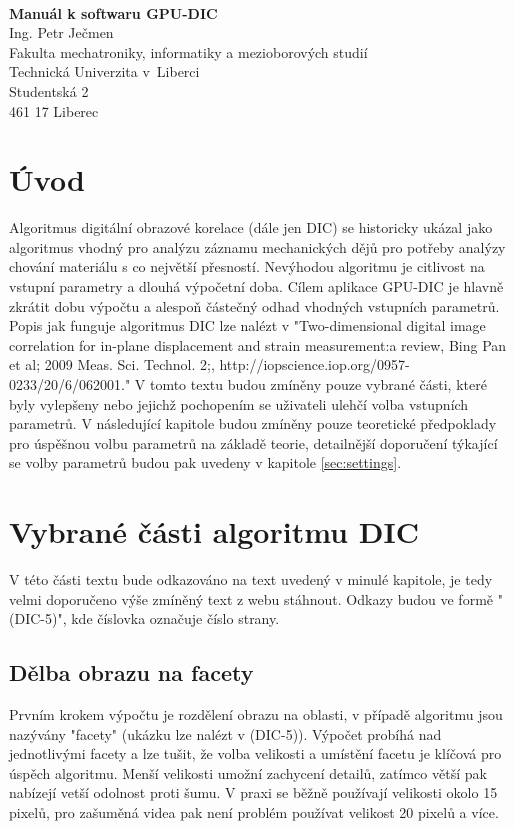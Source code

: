 \documentclass[a4paper,12pt]{article}
\date{September 13, 2013}
\begin{document}
\listoftodos
\newpage
\logo
\\\vspace{6pt}
\begin{center}
\large{\bfseries Manuál k softwaru GPU-DIC}
\\\vspace{1pc}
\small{
Ing. Petr Ječmen
\\\vspace{1pc}
Fakulta mechatroniky, informatiky a mezioborových studií\\
Technická Univerzita v~Liberci\\
Studentská 2\\
461 17 Liberec}
\end{center}
\newpage
\section{Úvod}
Algoritmus digitální obrazové korelace (dále jen DIC) se historicky ukázal jako algoritmus vhodný pro analýzu záznamu mechanických dějů pro potřeby analýzy chování materiálu s co největší přesností. Nevýhodou algoritmu je citlivost na vstupní parametry a dlouhá výpočetní doba. Cílem aplikace GPU-DIC je  hlavně zkrátit dobu výpočtu a alespoň částečný odhad vhodných vstupních parametrů.
Popis jak funguje algoritmus DIC lze nalézt v "Two-dimensional digital image correlation for in-plane displacement and strain measurement:a review, Bing Pan et al; 2009 Meas. Sci. Technol. 2;, http://iopscience.iop.org/0957-0233/20/6/062001." V tomto textu budou zmíněny pouze vybrané části, které byly vylepšeny nebo jejichž pochopením se uživateli ulehčí volba vstupních parametrů. V následující kapitole budou zmíněny pouze teoretické předpoklady pro úspěšnou volbu parametrů na základě teorie, detailnější doporučení týkající se volby parametrů budou pak uvedeny v kapitole \ref{sec:settings}.
\newpage
\section{Vybrané části algoritmu DIC}
V této části textu bude odkazováno na text uvedený v minulé kapitole, je tedy velmi doporučeno výše zmíněný text z webu stáhnout. Odkazy budou ve formě "(DIC-5)", kde číslovka označuje číslo strany.
\subsection{Dělba obrazu na facety}
Prvním krokem výpočtu je rozdělení obrazu na oblasti, v případě algoritmu jsou nazývány "facety" (ukázku lze nalézt v (DIC-5)). Výpočet probíhá nad jednotlivými facety a lze tušit, že volba velikosti a umístění facetu je klíčová pro úspěch algoritmu. Menší velikosti umožní zachycení detailů, zatímco větší pak nabízejí vetší odolnost proti šumu. V praxi se běžně používají velikosti okolo 15 pixelů, pro zašuměná videa pak není problém používat velikost 20 pixelů a více.
\end{document}
